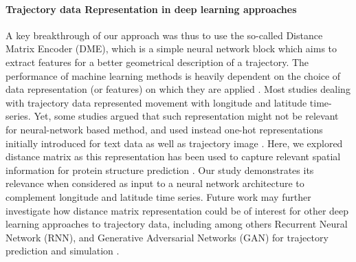 \documentclass{article}
\begin{document}
\paragraph{Trajectory data Representation in deep learning approaches}
A key breakthrough of our approach was thus to use the so-called Distance Matrix Encoder (DME), which is a simple neural network block which aims to extract features for a better geometrical description of a trajectory.
The performance of machine learning methods is heavily dependent on the choice of data representation (or features) on which they are applied \citep{bengio_representation_2014}.
Most studies dealing with trajectory data represented movement with longitude and latitude time-series. Yet, some studies argued that such representation might not be relevant for neural-network based method, and used instead one-hot representations initially introduced for text data  \citep{nguyen_geotracknet-maritime_2021} as well as trajectory image \citep{endo_classifying_2016}. Here, we explored distance matrix as this representation has been used to capture relevant spatial information for protein structure prediction \citep{senior_improved_2020}. Our study  demonstrates its relevance when considered as input to a neural network architecture to complement longitude and latitude time series. Future work may further investigate how distance matrix representation could be of interest for other deep learning approaches to trajectory data, including among others Recurrent Neural Network (RNN), and Generative Adversarial Networks (GAN) for trajectory prediction and simulation \citep{ardakani_encoding_2017,goodfellow_generative_2016,rew_animal_2019}.
\end{document}
